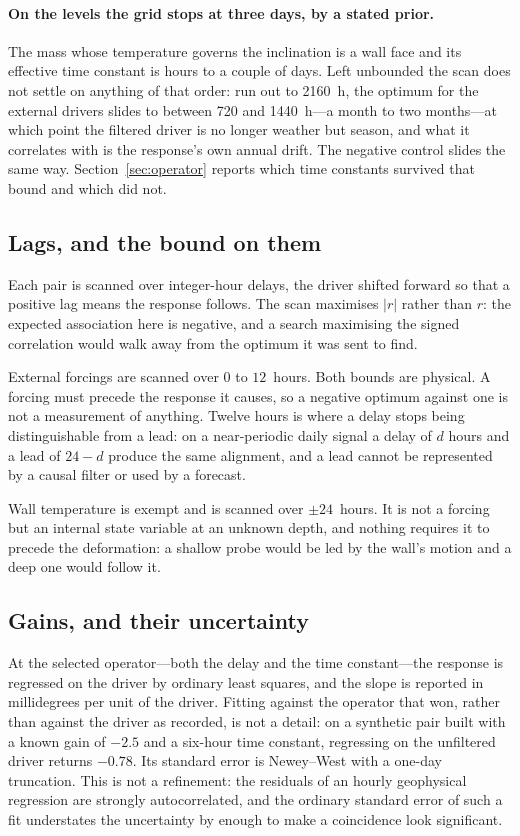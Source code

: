 \documentclass[11pt,a4paper]{article}
\begin{document}
\paragraph{On the levels the grid stops at three days, by a stated prior.} The
mass whose temperature governs the inclination is a wall face and its effective
time constant is hours to a couple of days. Left unbounded the scan does not
settle on anything of that order: run out to 2160~h, the optimum for the
external drivers slides to between 720 and 1440~h---a month to two
months---at which point the filtered driver is no longer weather but season, and
what it correlates with is the response's own annual drift. The negative control
slides the same way. Section~\ref{sec:operator} reports which time constants
survived that bound and which did not.

\subsection{Lags, and the bound on them}

Each pair is scanned over integer-hour delays, the driver shifted forward so
that a positive lag means the response follows. The scan maximises $|r|$ rather than
$r$: the expected association here is negative, and a search maximising the
signed correlation would walk away from the optimum it was sent to find.

External forcings are scanned over $0$ to $12$~hours. Both bounds are physical.
A forcing must precede the response it causes, so a negative optimum against one
is not a measurement of anything. Twelve hours is where a delay stops being
distinguishable from a lead: on a near-periodic daily signal a delay of $d$
hours and a lead of $24-d$ produce the same alignment, and a lead cannot be
represented by a causal filter or used by a forecast.

Wall temperature is exempt and is scanned over $\pm 24$~hours. It is not a
forcing but an internal state variable at an unknown depth, and nothing requires
it to precede the deformation: a shallow probe would be led by the wall's motion
and a deep one would follow it.

\subsection{Gains, and their uncertainty}

At the selected operator---both the delay and the time constant---the response
is regressed on the driver by ordinary least squares, and the slope is reported
in millidegrees per unit of the driver. Fitting against the operator that won,
rather than against the driver as recorded, is not a detail: on a synthetic pair
built with a known gain of $-2.5$ and a six-hour time constant, regressing on
the unfiltered driver returns $-0.78$. Its
standard error is Newey--West with a one-day truncation. This is not a
refinement: the residuals of an hourly geophysical regression are strongly
autocorrelated, and the ordinary standard error of such a fit understates the
uncertainty by enough to make a coincidence look significant.
\end{document}

